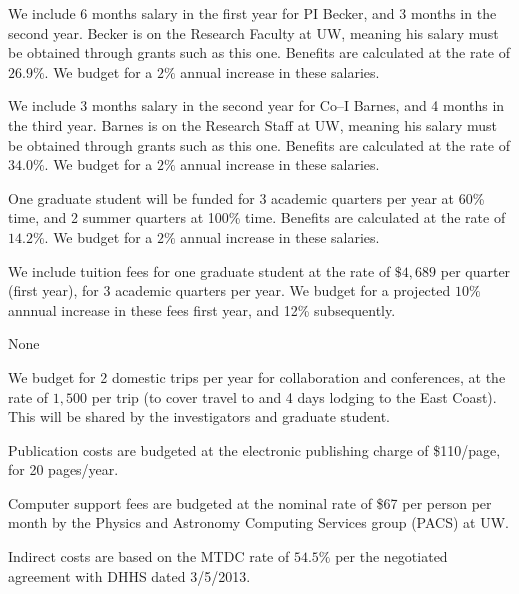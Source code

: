 \bigskip {} 

We include 6 months salary in the first year for PI Becker, and 3
months in the second year. Becker is on the Research Faculty at UW,
meaning his salary must be obtained through grants such as this one.
Benefits are calculated at the rate of $26.9\%$.  We budget for a
$2\%$ annual increase in these salaries.

We include 3 months salary in the second year for Co--I Barnes, and 4
months in the third year.  Barnes is on the Research Staff at UW,
meaning his salary must be obtained through grants such as this one.
Benefits are calculated at the rate of $34.0\%$.  We budget for a
$2\%$ annual increase in these salaries.

\bigskip {} 

One graduate student will be funded for 3 academic quarters per year
at 60\% time, and 2 summer quarters at 100\% time.  Benefits are
calculated at the rate of $14.2\%$.  We budget for a $2\%$ annual
increase in these salaries.

\bigskip {} 

We include tuition fees for one graduate student at the rate of
$\$4,689$ per quarter (first year), for 3 academic quarters per year.
We budget for a projected $10\%$ annnual increase in these fees first
year, and 12\% subsequently.

\bigskip {} 

None

\bigskip {} 

We budget for 2 domestic trips per year for collaboration and
conferences, at the rate of $1,500$ per trip (to cover travel to and 4
days lodging to the East Coast).  This will be shared by the
investigators and graduate student.

\bigskip {} 

Publication costs are budgeted at the electronic publishing charge
of \$110/page, for 20 pages/year.

\bigskip {} 

Computer support fees are budgeted at the nominal rate of \$67 per
person per month by the Physics and Astronomy Computing Services group
(PACS) at UW.  

\bigskip {} 

Indirect costs are based on the MTDC rate of $54.5\%$ per the
negotiated agreement with DHHS dated 3/5/2013.


